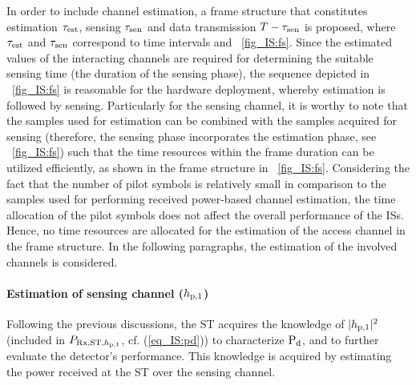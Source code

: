 In order to include channel estimation, a frame structure that constitutes estimation $\tau_{\text{est}}$, sensing $\tau_{\text{sen}}$ and data transmission $T - \tau_{\text{sen}}$ is proposed, where $\tau_{\text{est}}$ and $\tau_{\text{sen}}$ correspond to time intervals and  \figurename~{\ref{fig_IS:fs}}. Since the estimated values of the interacting channels are required for determining the suitable sensing time (the duration of the sensing phase), the sequence depicted in \figurename~{\ref{fig_IS:fs}} is reasonable for the hardware deployment, whereby estimation is followed by sensing.
Particularly for the sensing channel, it is worthy to note that the samples used for estimation can be combined with the samples acquired for sensing (therefore, the sensing phase incorporates the estimation phase, see \figurename~\ref{fig_IS:fs}) such that the time resources within the frame duration can be utilized efficiently, as shown in the frame structure in \figurename~\ref{fig_IS:fs}.
Considering the fact that the number of pilot symbols is relatively small in comparison to the samples used for performing received power-based channel estimation, the time allocation of the pilot symbols does not affect the overall performance of the ISs. Hence, no time resources are allocated for the estimation of the access channel in the frame structure. In the following paragraphs, the estimation of the involved channels is considered.


\paragraph{Estimation of sensing channel ($h_{\text{p,1}}$)}
Following the previous discussions, the ST acquires the knowledge of $|h_{\text{p,1}}|^2$ (included in $P_{\text{Rx,ST,$h_{\text{p,1}}$}}$, cf. (\ref{eq_IS:pd})) to characterize $\text{P}_{\text{d}}$, and to further evaluate the detector's performance. This knowledge is acquired by estimating the power received at the ST over the sensing channel. %


